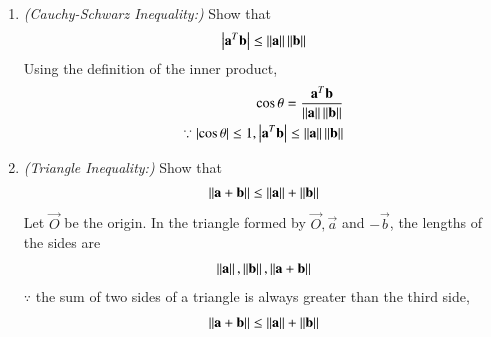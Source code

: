 \renewcommand{\theequation}{\theenumi}
\begin{enumerate}[label=\thesection.\arabic*.,ref=\thesection.\theenumi]
\item {\em  (Cauchy-Schwarz Inequality:)} Show that 
%
\begin{align}
\left\vert\mathbf{a}^T\mathbf{b}\right\vert \le \left\lVert\mathbf{a}\right\rVert\left\lVert\mathbf{b}\right\rVert
\end{align}
\proof  Using the definition of the inner product,
\begin{align}
\cos \theta = \frac{\mathbf{a}^T\mathbf{b}} {\left\lVert\mathbf{a}\right\rVert\left\lVert\mathbf{b}\right\rVert} 
\\
\because \left\vert\cos \theta\right\vert \le 1, 
\left\vert\mathbf{a}^T\mathbf{b}\right\vert \le \left\lVert\mathbf{a}\right\rVert\left\lVert\mathbf{b}\right\rVert
\end{align}
\item {\em (Triangle Inequality:)} Show that 
%
\begin{align}
\left\lVert\mathbf{a}+\mathbf{b}\right\rVert \le \left\lVert\mathbf{a}\right\rVert+\left\lVert\mathbf{b}\right\rVert
\end{align}
\proof Let $\vec{O}$ be the origin.  In the triangle formed by $\vec{O}, \vec{a}$ and $-\vec{b}$, the lengths of the sides are
%
\begin{align}
\left\lVert\mathbf{a}\right\rVert, 
\left\lVert\mathbf{b}\right\rVert, 
\left\lVert\mathbf{a}+\mathbf{b}\right\rVert 
\end{align}
%
$\because $ the sum of two sides of a triangle is always greater than the third side, 
\begin{align}
\left\lVert\mathbf{a}+\mathbf{b}\right\rVert \le \left\lVert\mathbf{a}\right\rVert + \left\lVert\mathbf{b}\right\rVert
\end{align}

\end{enumerate}

